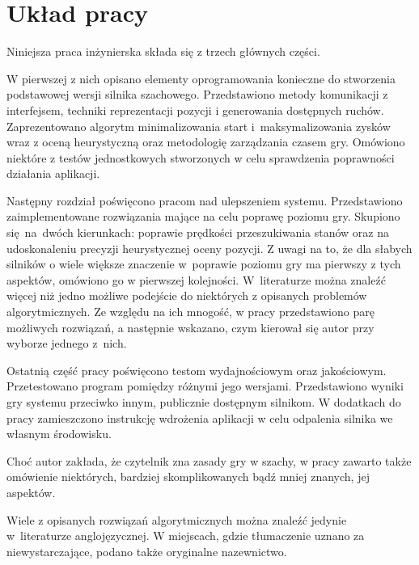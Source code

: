 \section{Układ pracy}
\label{sec:uklad-pracy}

Niniejsza praca inżynierska składa się z trzech głównych części.

W pierwszej z nich opisano elementy oprogramowania konieczne do stworzenia podstawowej wersji silnika szachowego.
Przedstawiono metody komunikacji z interfejsem, techniki reprezentacji pozycji i generowania dostępnych ruchów.
Zaprezentowano algorytm minimalizowania start i~maksymalizowania zysków wraz z oceną heurystyczną oraz metodologię zarządzania czasem gry.
Omówiono niektóre z testów jednostkowych stworzonych w celu sprawdzenia poprawności działania aplikacji.

Następny rozdział poświęcono pracom nad ulepszeniem systemu.
Przedstawiono zaimplementowane rozwiązania mające na celu poprawę poziomu gry.
Skupiono się~na~dwóch kierunkach: poprawie prędkości przeszukiwania stanów oraz na udoskonaleniu precyzji heurystycznej oceny pozycji.
Z uwagi na to, że dla słabych silników o wiele większe znaczenie w~poprawie poziomu gry ma pierwszy z tych aspektów, omówiono go w pierwszej kolejności\cite*{Vrzina2023}.
W~literaturze można znaleźć więcej niż jedno możliwe podejście do niektórych z opisanych problemów algorytmicznych.
Ze względu na ich mnogość, w pracy przedstawiono parę możliwych rozwiązań, a następnie wskazano, czym kierował się autor przy wyborze jednego z~nich.

Ostatnią część pracy poświęcono testom wydajnościowym oraz jakościowym.
Przetestowano program pomiędzy różnymi jego wersjami.
Przedstawiono wyniki gry systemu przeciwko innym, publicznie dostępnym silnikom.
W dodatkach do pracy zamieszczono instrukcję wdrożenia aplikacji w celu odpalenia silnika we własnym środowisku.

Choć autor zakłada, że czytelnik zna zasady gry w szachy, w pracy zawarto także omówienie niektórych, bardziej skomplikowanych bądź mniej znanych, jej aspektów.

Wiele z opisanych rozwiązań algorytmicznych można znaleźć jedynie w~literaturze anglojęzycznej.
W miejscach, gdzie tłumaczenie uznano za niewystarczające, podano także oryginalne nazewnictwo.